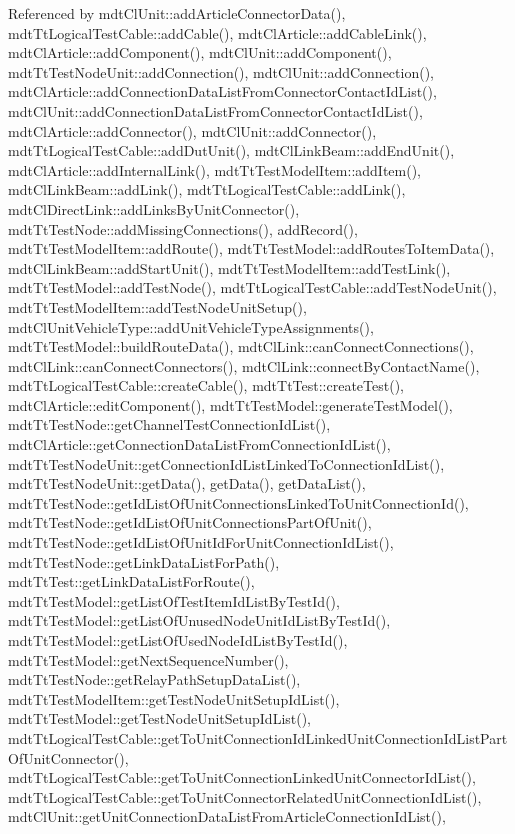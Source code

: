 Referenced by mdt\-Cl\-Unit\-::add\-Article\-Connector\-Data(), mdt\-Tt\-Logical\-Test\-Cable\-::add\-Cable(), mdt\-Cl\-Article\-::add\-Cable\-Link(), mdt\-Cl\-Article\-::add\-Component(), mdt\-Cl\-Unit\-::add\-Component(), mdt\-Tt\-Test\-Node\-Unit\-::add\-Connection(), mdt\-Cl\-Unit\-::add\-Connection(), mdt\-Cl\-Article\-::add\-Connection\-Data\-List\-From\-Connector\-Contact\-Id\-List(), mdt\-Cl\-Unit\-::add\-Connection\-Data\-List\-From\-Connector\-Contact\-Id\-List(), mdt\-Cl\-Article\-::add\-Connector(), mdt\-Cl\-Unit\-::add\-Connector(), mdt\-Tt\-Logical\-Test\-Cable\-::add\-Dut\-Unit(), mdt\-Cl\-Link\-Beam\-::add\-End\-Unit(), mdt\-Cl\-Article\-::add\-Internal\-Link(), mdt\-Tt\-Test\-Model\-Item\-::add\-Item(), mdt\-Cl\-Link\-Beam\-::add\-Link(), mdt\-Tt\-Logical\-Test\-Cable\-::add\-Link(), mdt\-Cl\-Direct\-Link\-::add\-Links\-By\-Unit\-Connector(), mdt\-Tt\-Test\-Node\-::add\-Missing\-Connections(), add\-Record(), mdt\-Tt\-Test\-Model\-Item\-::add\-Route(), mdt\-Tt\-Test\-Model\-::add\-Routes\-To\-Item\-Data(), mdt\-Cl\-Link\-Beam\-::add\-Start\-Unit(), mdt\-Tt\-Test\-Model\-Item\-::add\-Test\-Link(), mdt\-Tt\-Test\-Model\-::add\-Test\-Node(), mdt\-Tt\-Logical\-Test\-Cable\-::add\-Test\-Node\-Unit(), mdt\-Tt\-Test\-Model\-Item\-::add\-Test\-Node\-Unit\-Setup(), mdt\-Cl\-Unit\-Vehicle\-Type\-::add\-Unit\-Vehicle\-Type\-Assignments(), mdt\-Tt\-Test\-Model\-::build\-Route\-Data(), mdt\-Cl\-Link\-::can\-Connect\-Connections(), mdt\-Cl\-Link\-::can\-Connect\-Connectors(), mdt\-Cl\-Link\-::connect\-By\-Contact\-Name(), mdt\-Tt\-Logical\-Test\-Cable\-::create\-Cable(), mdt\-Tt\-Test\-::create\-Test(), mdt\-Cl\-Article\-::edit\-Component(), mdt\-Tt\-Test\-Model\-::generate\-Test\-Model(), mdt\-Tt\-Test\-Node\-::get\-Channel\-Test\-Connection\-Id\-List(), mdt\-Cl\-Article\-::get\-Connection\-Data\-List\-From\-Connection\-Id\-List(), mdt\-Tt\-Test\-Node\-Unit\-::get\-Connection\-Id\-List\-Linked\-To\-Connection\-Id\-List(), mdt\-Tt\-Test\-Node\-Unit\-::get\-Data(), get\-Data(), get\-Data\-List(), mdt\-Tt\-Test\-Node\-::get\-Id\-List\-Of\-Unit\-Connections\-Linked\-To\-Unit\-Connection\-Id(), mdt\-Tt\-Test\-Node\-::get\-Id\-List\-Of\-Unit\-Connections\-Part\-Of\-Unit(), mdt\-Tt\-Test\-Node\-::get\-Id\-List\-Of\-Unit\-Id\-For\-Unit\-Connection\-Id\-List(), mdt\-Tt\-Test\-Node\-::get\-Link\-Data\-List\-For\-Path(), mdt\-Tt\-Test\-::get\-Link\-Data\-List\-For\-Route(), mdt\-Tt\-Test\-Model\-::get\-List\-Of\-Test\-Item\-Id\-List\-By\-Test\-Id(), mdt\-Tt\-Test\-Model\-::get\-List\-Of\-Unused\-Node\-Unit\-Id\-List\-By\-Test\-Id(), mdt\-Tt\-Test\-Model\-::get\-List\-Of\-Used\-Node\-Id\-List\-By\-Test\-Id(), mdt\-Tt\-Test\-Model\-::get\-Next\-Sequence\-Number(), mdt\-Tt\-Test\-Node\-::get\-Relay\-Path\-Setup\-Data\-List(), mdt\-Tt\-Test\-Model\-Item\-::get\-Test\-Node\-Unit\-Setup\-Id\-List(), mdt\-Tt\-Test\-Model\-::get\-Test\-Node\-Unit\-Setup\-Id\-List(), mdt\-Tt\-Logical\-Test\-Cable\-::get\-To\-Unit\-Connection\-Id\-Linked\-Unit\-Connection\-Id\-List\-Part\-Of\-Unit\-Connector(), mdt\-Tt\-Logical\-Test\-Cable\-::get\-To\-Unit\-Connection\-Linked\-Unit\-Connector\-Id\-List(), mdt\-Tt\-Logical\-Test\-Cable\-::get\-To\-Unit\-Connector\-Related\-Unit\-Connection\-Id\-List(), mdt\-Cl\-Unit\-::get\-Unit\-Connection\-Data\-List\-From\-Article\-Connection\-Id\-List(), 